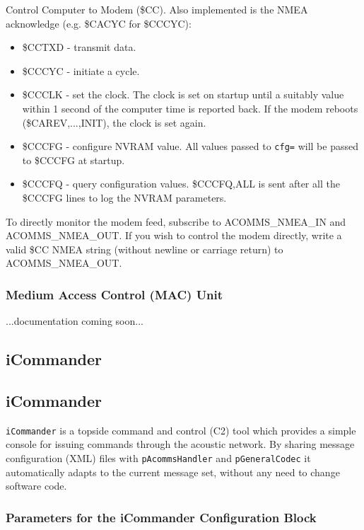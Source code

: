 \documentclass[11pt, letterpaper, oneside]{memoir}
\begin{document}
Control Computer to Modem (\$CC). Also implemented is the NMEA acknowledge (e.g. \$CACYC for \$CCCYC):
\begin{itemize}
\item \$CCTXD - transmit data. 
\item \$CCCYC - initiate a cycle.
\item \$CCCLK - set the clock. The clock is set on startup until a suitably value within 1 second of the computer time is reported back. If the modem reboots (\$CAREV,...,INIT), the clock is set again.
\item \$CCCFG - configure NVRAM value. All values passed to \verb|cfg=| will be passed to \$CCCFG at startup. 
\item \$CCCFQ - query configuration values. \$CCCFQ,ALL is sent after all the \$CCCFG lines to log the NVRAM parameters.
\end{itemize}

To directly monitor the modem feed, subscribe to ACOMMS\_NMEA\_IN and ACOMMS\_NMEA\_OUT. If you wish to control the modem directly, write a valid \$CC NMEA string (without newline or carriage return) to ACOMMS\_NMEA\_OUT.

\subsubsection{Medium Access Control (MAC) Unit}

...documentation coming soon...


\subsection{iCommander}


\subsection{iCommander}\label{sec:icommander} 

\verb|iCommander| is a topside command and control (C2) tool which provides a simple
console for issuing commands through the acoustic network. By sharing
message configuration (XML) files with \verb|pAcommsHandler| and \verb|pGeneralCodec| it automatically adapts to the current message set,
without any need to change software code.

\subsubsection{Parameters for the iCommander Configuration Block}
\end{document}
